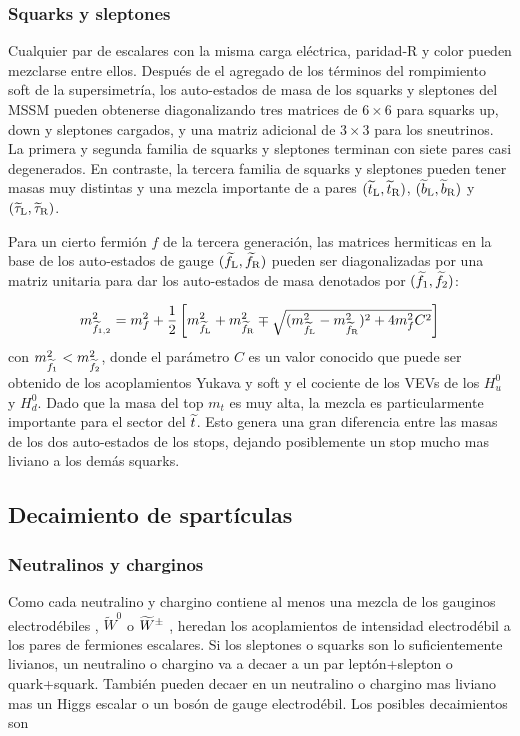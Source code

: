 \subsubsection{Squarks y sleptones}

Cualquier par de escalares con la misma carga eléctrica, paridad-R y color
pueden mezclarse entre ellos. Después de el agregado de los términos del
rompimiento soft de la supersimetría, los auto-estados de masa de los squarks y
sleptones del MSSM pueden obtenerse diagonalizando tres matrices de $6\times6$
para squarks up, down y sleptones cargados, y una matriz adicional de $3\times
3$ para los sneutrinos. La primera y segunda familia de squarks y sleptones
terminan con siete pares casi degenerados. En contraste, la tercera familia de
squarks y sleptones pueden tener masas muy distintas y una mezcla importante de
a pares $(\widetilde{t}_{\mathrm{L}}, \widetilde{t}_{\mathrm{R}})$, $(\widetilde{b}_{\mathrm{L}}, \widetilde{b}_{\mathrm{R}})$ y $(\widetilde{\tau}_{\mathrm{L}}, \widetilde{\tau}_{\mathrm{R}})$.

Para un cierto fermión $f$ de la tercera generación, las matrices hermiticas en
la base de los auto-estados de gauge $(\widetilde{f}_{\mathrm{L}}, \widetilde{f}_{\mathrm{R}})$ pueden ser
diagonalizadas por una matriz unitaria para dar los auto-estados de masa
denotados por $(\widetilde{f}_{\mathrm{1}}, \widetilde{f}_{\mathrm{2}})$:

\begin{equation}
  m_{\widetilde{f}_{\mathrm{1,2}}}^2 = m^2_f + \frac{1}{2} \left[
    m_{\widetilde{f}_{\mathrm{L}}}^2 + m_{\widetilde{f}_{\mathrm{R}}}^2 \mp \sqrt{(m_{\widetilde{f}_{\mathrm{L}}}^2 -
      m_{\widetilde{f}_{\mathrm{R}}}^2)^2 + 4 m_f^2 C^2} \right]
\end{equation}
%
con $m_{\widetilde{f}_{\mathrm{1}}}^2 < m_{\widetilde{f}_{\mathrm{2}}}^2$, donde el parámetro $C$ es un
valor conocido que puede ser obtenido de los acoplamientos Yukava y soft y el
cociente de los VEVs de los $H_u^0$ y $H_d^0$. Dado que la masa del top $m_t$ es
muy alta, la mezcla es particularmente importante para el sector del $\widetilde{t}$.
Esto genera una gran diferencia entre las masas de los dos auto-estados de los
stops, dejando posiblemente un stop mucho mas liviano a los demás squarks.


\subsection{Decaimiento de spartículas}

\subsubsection{Neutralinos y charginos}

Como cada neutralino y chargino contiene al menos una mezcla de los gauginos
electrodébiles {\bino}, $\tilde W^0$ o $\widetilde{W}^{\pm}$ , heredan los
acoplamientos de intensidad electrodébil a los pares de fermiones escalares. Si
los sleptones o squarks son lo suficientemente livianos, un neutralino o
chargino va a decaer a un par leptón+slepton o quark+squark. También pueden
decaer en un neutralino o chargino mas liviano mas un Higgs escalar o un bosón
de gauge electrodébil. Los posibles decaimientos son

